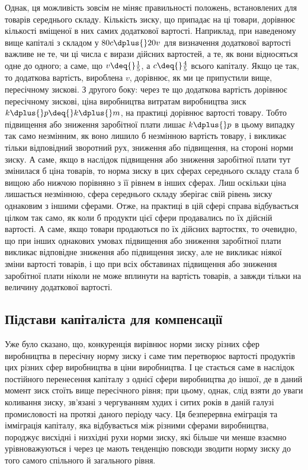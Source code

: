 Однак, ця можливість зовсім не міняє правильності положень, встановлених для товарів
середнього складу. Кількість зиску, що припадає на ці товари, дорівнює кількості вміщеної в них
самих додаткової вартості. Наприклад, при наведеному вище капіталі з складом у $80 c \dplus{} 20 v$ для
визначення додаткової вартості важливе не те, чи ці числа є вирази дійсних вартостей, а те, як вони
відносяться одне до одного; а саме, що $v \deq{} \frac{1}{5}$, а $c \deq{} \frac{4}{5}$  всього капіталу. Якщо це так, то
додаткова вартість, вироблена $v$, дорівнює, як ми це припустили вище, пересічному зискові. З другого
боку: через те що додаткова вартість дорівнює пересічному зискові, ціна виробництва \deq{} витратам
виробництва \dplus{} зиск \deq{} $k \dplus{} p \deq{} k \dplus{} m$, на практиці дорівнює вартості товару. Тобто підвищення або
зниження заробітної плати лишає $k \dplus{} p$  в цьому випадку так само незмінним, як воно лишило б
незмінною вартість товару, і викликає тільки відповідний зворотний рух,
зниження або підвищення, на стороні норми зиску. А саме, якщо в наслідок підвищення або зниження
заробітної плати тут змінилася б ціна товарів, то норма зиску в цих сферах середнього складу стала б
вищою або нижчою порівняно з її рівнем в інших
сферах. Лиш оскільки ціна лишається незмінною, сфера
середнього складу зберігає свій рівень зиску однаковим з іншими сферами. Отже, на практиці в цій
сфері справа відбувається цілком так само, як коли б продукти цієї сфери продавались по їх дійсній
вартості. А саме, якщо товари продаються по їх дійсних вартостях, то очевидно, що при інших
однакових умовах підвищення або зниження заробітної плати викликає відповідне зниження або підвищення зиску,
але не викликає ніякої зміни вартості товарів, і що при всіх обставинах підвищення або зниження
заробітної плати ніколи не може вплинути на вартість товарів, а завжди тільки на величину додаткової
вартості.

\subsection{Підстави капіталіста для компенсації}

Уже було сказано, що, конкуренція вирівнює норми зиску різних сфер виробництва в пересічну норму
зиску і саме тим перетворює вартості продуктів цих різних сфер виробництва в ціни виробництва. І це
стається саме в наслідок постійного перенесення капіталу з однієї сфери виробництва до іншої, де в
даний момент зиск стоїть вище пересічного рівня; при цьому, однак, слід взяти до уваги коливання
зиску, зв’язані з чергуванням худих і ситих років в даній галузі промисловості на протязі даного
періоду часу. Ця безперервна еміграція та імміграція капіталу, яка відбувається між різними сферами
виробництва, породжує висхідні і низхідні рухи норми зиску, які більше чи менше взаємно
урівноважуються і через це мають тенденцію повсюди зводити норму зиску до того самого спільного й загального рівня.

